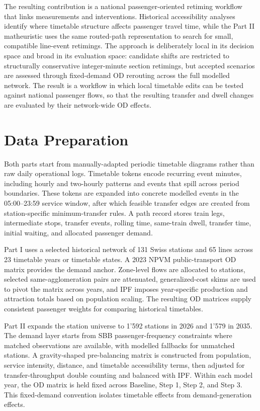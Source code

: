 \documentclass[conference]{IEEEtran}
\begin{document}
The resulting contribution is a national passenger-oriented retiming workflow that links measurements and interventions. Historical accessibility analyses identify where timetable structure affects passenger travel time, while the Part II matheuristic uses the same routed-path representation to search for small, compatible line-event retimings. The approach is deliberately local in its decision space and broad in its evaluation space: candidate shifts are restricted to structurally conservative integer-minute section retimings, but accepted scenarios are assessed through fixed-demand OD rerouting across the full modelled network. The result is a workflow in which local timetable edits can be tested against national passenger flows, so that the resulting transfer and dwell changes are evaluated by their network-wide OD effects.

\section{Data Preparation}
Both parts start from manually-adapted periodic timetable diagrams \cite{smaPartnerDownloads} rather than raw daily operational logs. Timetable tokens encode recurring event minutes, including hourly and two-hourly patterns and events that spill across period boundaries. These tokens are expanded into concrete modelled events in the 05:00--23:59 service window, after which feasible transfer edges are created from station-specific minimum-transfer rules. A path record stores train legs, intermediate stops, transfer events, rolling time, same-train dwell, transfer time, initial waiting, and allocated passenger demand.

Part I uses a selected historical network of 131 Swiss stations and 65 lines across 23 timetable years or timetable states. A 2023 NPVM public-transport OD matrix provides the demand anchor. Zone-level flows are allocated to stations, selected same-agglomeration pairs are attenuated, generalized-cost skims are used to pivot the matrix across years, and IPF imposes year-specific production and attraction totals based on population scaling. The resulting OD matrices supply consistent passenger weights for comparing historical timetables.

Part II expands the station universe to 1'592 stations in 2026 and 1'579 in 2035. The demand layer starts from SBB passenger-frequency constraints where matched observations are available, with modelled fallbacks for unmatched stations. A gravity-shaped pre-balancing matrix is constructed from population, service intensity, distance, and timetable accessibility terms, then adjusted for transfer-throughput double counting and balanced with IPF. Within each model year, the OD matrix is held fixed across Baseline, Step 1, Step 2, and Step 3. This fixed-demand convention isolates timetable effects from demand-generation effects.
\end{document}
